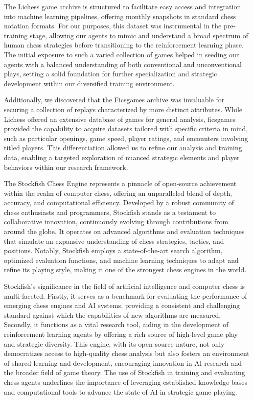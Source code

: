 \documentclass[journal]{IEEEtran}
\begin{document}
	The Lichess game archive is structured to facilitate easy access and integration into machine learning pipelines, 
	offering monthly snapshots in standard chess notation formats. 
	For our purposes, this dataset was instrumental in the pre-training stage, 
	allowing our agents to mimic and understand a broad spectrum of human chess strategies before transitioning to the reinforcement learning phase. 
	The initial exposure to such a varied collection of games helped in seeding our agents with a balanced understanding of both conventional and unconventional plays, 
	setting a solid foundation for further specialization and strategic development within our diversified training environment.
	
	Additionally, we discovered that the Ficsgames archive\cite{zotero-2272} was invaluable for securing a collection of replays characterized by more distinct attributes. 
	While Lichess offered an extensive database of games for general analysis, 
	ficsgames provided the capability to acquire datasets tailored with specific criteria in mind, 
	such as particular openings, game speed, player ratings, and encounters involving titled players. 
	This differentiation allowed us to refine our analysis and training data, 
	enabling a targeted exploration of nuanced strategic elements and player behaviors within our research framework.
	
	The Stockfish Chess Engine \cite{romstad} represents a pinnacle of open-source achievement within the realm of computer chess, 
	offering an unparalleled blend of depth, accuracy, and computational efficiency. 
	Developed by a robust community of chess enthusiasts and programmers, Stockfish stands as a testament to collaborative innovation, 
	continuously evolving through contributions from around the globe. 
	It operates on advanced algorithms and evaluation techniques that simulate an expansive 
	understanding of chess strategies, tactics, and positions. 
	Notably, Stockfish employs a state-of-the-art search algorithm, optimized evaluation functions, 
	and machine learning techniques to adapt and refine its playing style, making it one of the strongest chess engines in the world.
		
	Stockfish's significance in the field of artificial intelligence and computer chess is multi-faceted. 
	Firstly, it serves as a benchmark for evaluating the performance of emerging chess engines and AI systems, 
	providing a consistent and challenging standard against which the capabilities of new algorithms are measured. 
	Secondly, it functions as a vital research tool, aiding in the development of 
	reinforcement learning agents by offering a rich source of high-level game play and strategic diversity. 
	This engine, with its open-source nature, not only democratizes access to high-quality chess analysis but also fosters an 
	environment of shared learning and development, encouraging innovation in AI research and the broader field of game theory. 
	The use of Stockfish in training and evaluating chess agents underlines the importance of leveraging 
	established knowledge bases and computational tools to advance the state of AI in strategic game playing.
	
\end{document}
